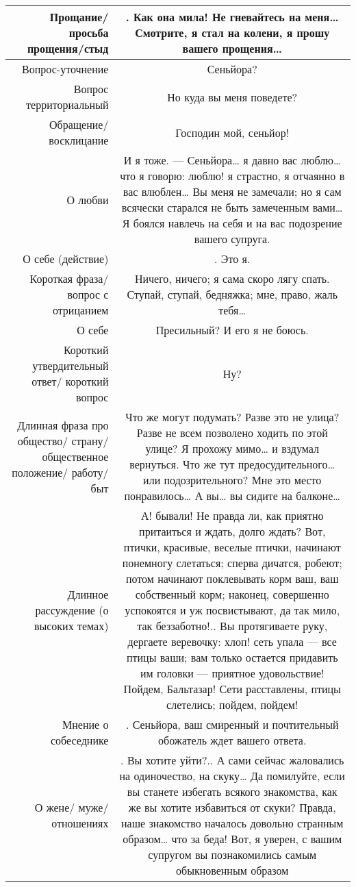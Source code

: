 \documentclass[a4paper,14pt]{article}
\begin{document}
\begin{center}
\begin{tabularx}{\linewidth}{ | N | C | }
Прощание/ просьба прощения/стыд&. Как она мила!  Не гневайтесь на меня…  Смотрите, я стал на колени, я прошу вашего прощения…\\ \hline
Вопрос-уточнение&Сеньйора?\\ \hline
Вопрос территориальный &Но куда вы меня поведете?\\ \hline
Обращение/ восклицание&Господин мой, сеньйор!\\ \hline
О любви&И я тоже. —  Сеньйора… я давно вас             люблю… что я говорю: люблю! я страстно, я отчаянно в вас влюблен… Вы меня не замечали; но я сам всячески старался не быть замеченным вами… Я боялся навлечь на себя и на вас подозрение вашего супруга.\\ \hline
О себе (действие)&. Это я.\\ \hline
Короткая фраза/ вопрос с отрицанием&Ничего, ничего; я сама скоро лягу спать. Ступай, ступай, бедняжка; мне, право, жаль тебя…\\ \hline
О себе& Пресильный?  И его я не боюсь.\\ \hline
Короткий утвердительный ответ/ короткий вопрос&Ну?\\ \hline
Длинная фраза про общество/ страну/ общественное положение/ работу/ быт&Что же могут подумать? Разве это не улица? Разве не всем позволено ходить по этой  улице? Я прохожу мимо…  и вздумал вернуться. Что же тут предосудительного… или подозрительного? Мне это место понравилось… А вы… вы сидите на балконе…\\ \hline
Длинное рассуждение (о высоких темах)&А! бывали! Не правда ли, как приятно притаиться и ждать, долго ждать? Вот, птички, красивые, веселые птички, начинают понемногу слетаться; сперва дичатся, робеют; потом начинают поклевывать корм ваш, ваш собственный корм; наконец, совершенно успокоятся и уж посвистывают, да так мило, так беззаботно!.. Вы протягиваете руку, дергаете веревочку: хлоп! сеть упала — все птицы ваши; вам только остается придавить им головки — приятное удовольствие! Пойдем, Бальтазар! Сети расставлены, птицы слетелись; пойдем, пойдем!\\ \hline
Мнение о собеседнике&. Сеньйора, ваш смиренный и почтительный обожатель ждет вашего ответа.\\ \hline
О жене/ муже/ отношениях&. Вы хотите уйти?.. А сами сейчас жаловались на одиночество, на скуку… Да помилуйте, если вы станете избегать всякого знакомства, как же вы хотите избавиться от скуки? Правда, наше знакомство началось довольно странным образом… что за беда! Вот, я уверен, с вашим супругом вы познакомились самым обыкновенным образом \\ \hline
\end{tabularx}
\end{center}
\end{document}
